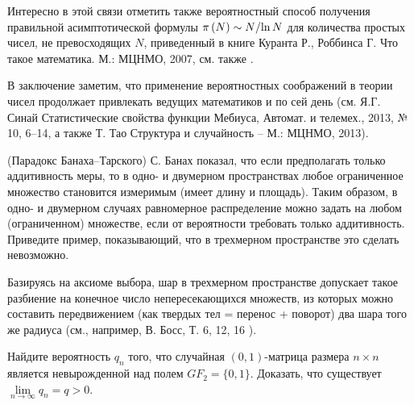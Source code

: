 \begin{remark}
Интересно в этой связи отметить также вероятностный способ получения 
правильной асимптотической формулы $\pi \left( N \right)\sim N 
\mathord{\left/ {\vphantom {N {\ln N}}} \right. \kern-\nulldelimiterspace} 
{\ln N}$ для количества простых чисел, не превосходящих $N$, приведенный в книге 
Куранта Р., Роббинса Г. Что такое математика. М.: МЦНМО, 2007, см. также \cite{2013}.

В заключение заметим, что применение вероятностных соображений в теории 
чисел продолжает привлекать ведущих математиков и по сей день (см. 
Я.Г. Синай Статистические свойства функции Мебиуса, Автомат. и телемех., 2013, № 10, 6–14, а также Т. Тао Структура и случайность -- М.: МЦНМО, 2013).
\end{remark}

\begin{problem}\Star(Парадокс Банаха--Тарского)
\label{banah_tar}
С. Банах показал, что если предполагать только аддитивность меры, то в одно- и двумерном пространствах любое ограниченное множество становится измеримым (имеет длину и площадь). Таким образом, в одно- и двумерном случаях равномерное распределение можно задать на любом (ограниченном) множестве, если от вероятности требовать только аддитивность. Приведите пример, показывающий, что в трехмерном пространстве это сделать невозможно. 
\end{problem}
\begin{remark}
Базируясь на аксиоме выбора, шар в трехмерном пространстве допускает такое разбиение на конечное число непересекающихся множеств, из которых можно составить передвижением (как твердых тел = перенос + поворот) два шара того же радиуса (см., например, В. Босс, Т. 6, 12, 16 \cite{2013}).
\end{remark}

\begin{problem}
Найдите вероятность $q_n$ того, что случайная $(0,1)$-матрица размера $n\times n$ является невырожденной над полем 
$GF_2=\{ 0,1\}$. Доказать, что существует $\lim\limits_{n\to\infty} q_n=q>0$. 
\end{problem}


